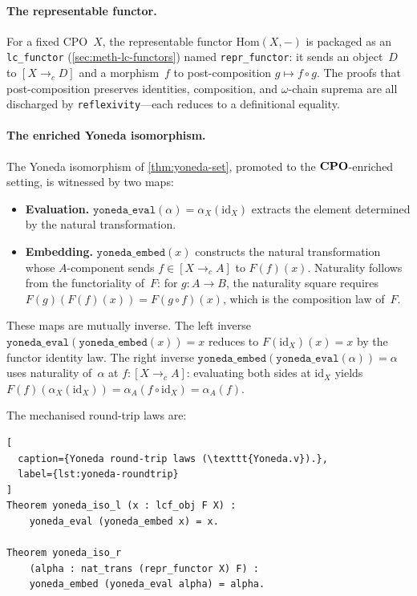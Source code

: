 \paragraph{The representable functor.}
For a fixed CPO~$X$, the representable functor
$\mathrm{Hom}(X, -)$ is packaged as an \texttt{lc\_functor}
(\cref{sec:meth-lc-functors}) named \texttt{repr\_functor}: it sends
an object~$D$ to $[X \to_c D]$ and a morphism~$f$ to
post-composition $g \mapsto f \circ g$.  The proofs that
post-composition preserves identities, composition, and $\omega$-chain
suprema are all discharged by \texttt{reflexivity}---each reduces to a
definitional equality.

\paragraph{The enriched Yoneda isomorphism.}
The Yoneda isomorphism of \cref{thm:yoneda-set}, promoted to the
$\mathbf{CPO}$-enriched setting, is witnessed by two maps:
\begin{itemize}
  \item \textbf{Evaluation.}\;
    $\texttt{yoneda\_eval}(\alpha) = \alpha_X(\mathrm{id}_X)$
    extracts the element determined by the natural transformation.
  \item \textbf{Embedding.}\;
    $\texttt{yoneda\_embed}(x)$ constructs the natural transformation
    whose $A$-component sends $f \in [X \to_c A]$ to $F(f)(x)$.
    Naturality follows from the functoriality of~$F$: for
    $g : A \to B$, the naturality square requires
    $F(g)(F(f)(x)) = F(g \circ f)(x)$, which is the
    composition law of~$F$.
\end{itemize}
These maps are mutually inverse.  The left inverse
$\texttt{yoneda\_eval}(\texttt{yoneda\_embed}(x)) = x$ reduces to
$F(\mathrm{id}_X)(x) = x$ by the functor identity law.  The right
inverse $\texttt{yoneda\_embed}(\texttt{yoneda\_eval}(\alpha)) =
\alpha$ uses naturality of~$\alpha$ at $f : [X \to_c A]$: evaluating
both sides at $\mathrm{id}_X$ yields
$F(f)(\alpha_X(\mathrm{id}_X)) = \alpha_A(f \circ \mathrm{id}_X)
= \alpha_A(f)$.

The mechanised round-trip laws are:

\begin{lstlisting}[
  caption={Yoneda round-trip laws (\texttt{Yoneda.v}).},
  label={lst:yoneda-roundtrip}
]
Theorem yoneda_iso_l (x : lcf_obj F X) :
    yoneda_eval (yoneda_embed x) = x.

Theorem yoneda_iso_r
    (alpha : nat_trans (repr_functor X) F) :
    yoneda_embed (yoneda_eval alpha) = alpha.
\end{lstlisting}

